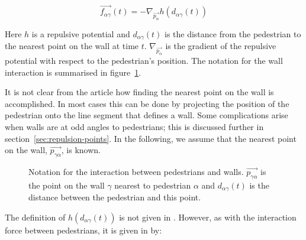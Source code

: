 \begin{equation}\label{wallpotential}
    \overrightarrow{f_{\alpha \gamma}}(t) =
    - \nabla_{\overrightarrow{p_{\alpha}}} h
    \left( d_{\alpha \gamma}(t) \right)
\end{equation}

Here $h$ is a repulsive potential and $d_{\alpha \gamma}(t)$ is the distance
from the pedestrian to the nearest point on the wall at time $t$.
$\nabla_{\overrightarrow{p_\alpha}}$ is the gradient of the repulsive
potential with respect to the pedestrian's position. The notation for the wall
interaction is summarised in figure~\ref{fig:wall-notation}.

It is not clear from the article how finding the nearest point on the wall is
accomplished. In most cases this can be done by projecting the position of the
pedestrian onto the line segment that defines a wall. Some complications
arise when walls are at odd angles to pedestrians; this is discussed further
in section~\ref{sec:repulsion-points}. In the following, we assume that the
nearest point on the wall, $\overrightarrow{p_{\gamma \alpha}}$, is known.

\begin{figure}[ht]
    \centering
    \caption[Notation for the interaction between pedestrians and
    walls]{Notation for the interaction between pedestrians and walls.
    $\overrightarrow{p_{\gamma \alpha}}$ is the point on the wall $\gamma$ nearest to pedestrian
    $\alpha$ and  $d_{\alpha \gamma}(t)$ is the distance between the
    pedestrian and this point.}
    \label{fig:wall-notation}
\end{figure}

The definition of $h\left( d_{\alpha \gamma}(t) \right)$ is not given in
\cite{self-org}. However, as with the interaction force between pedestrians,
it is given in \cite{ABconstant} by:

